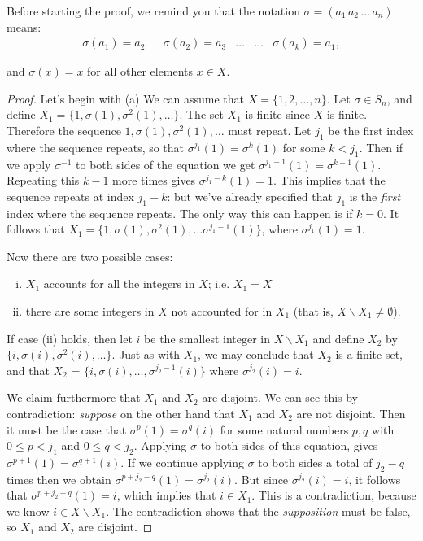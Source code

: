 \noindent
Before starting the proof, we remind you   that the notation $\sigma = (a_1 \, a_2 \, \ldots \, a_n)$ means:
\begin{align*}
\sigma( a_1 )  = a_2  & &
\sigma( a_2 )  = a_3 & 
 \ldots   & \ldots & 
\sigma( a_k )  = a_1,
\end{align*}

\noindent
and $\sigma( x) =x$ for all other elements $x \in X$.


\begin{proof}
Let's begin with (a)
We can assume that $X = \{ 1, 2, \ldots, n \}$. Let $\sigma \in S_n$,
and define $X_1 = \{1,  \sigma(1), \sigma^2(1), \ldots \}$. The set $X_1$ is finite since $X$ is finite. Therefore the sequence  $1, \sigma(1), \sigma^2(1), \ldots $ must repeat. Let $j_1$ be the first index where the sequence repeats, so that   $\sigma^{j_1}(1) = \sigma^k(1)$ for some $k < j_1$.  Then if we apply $\sigma^{-1}$  to both sides of the equation we get 
$\sigma^{j_1-1}(1) = \sigma^{k-1}(1)$. Repeating this $k-1$ more times gives $\sigma^{j_1-k}(1) = 1$. This implies that the sequence repeats at index $j_1-k$: but we've already specified that $j_1$ is the \emph{first} index where the sequence repeats. The only way this can happen is if $k=0$. It follows that $X_1 = \{1, \sigma(1), \sigma^2(1), \ldots \sigma^{j_1-1}(1) \}$, where $\sigma^{j_1}(1) = 1$.

Now there are two possible cases: 

\begin{enumerate}[(i)]
\item
$X_1$ accounts for all the integers in $X$; i.e. $X_1 = X$ 
\item
there are some integers in $X$ not accounted for in $X_1$ (that is, $X \backslash X_1 \neq \emptyset$).  
\end{enumerate}

If case (ii) holds, then  let $i$ be the smallest integer
in $X \backslash X_1$ and define $X_2$ by $\{ i, \sigma(i),
\sigma^2(i), \ldots \}$. Just as with $X_1$, we may conclude that $X_2$ is a finite set, and that $X_2$ = $\{ i, \sigma(i), \ldots, \sigma^{j_2-1}(i) \}$ where $\sigma^{j_2}(i) = i$.

We claim furthermore that  $X_1$ and $X_2$ are disjoint. We can see this by contradiction: \emph{suppose} on the other hand that $X_1$ and $X_2$ are not disjoint. Then it must be the case that $\sigma^p(1) = \sigma^q(i)$ for some natural numbers $p, q$ with $0 \le p < j_1$ and $0 \le q < j_2$. Applying $\sigma$ to both sides of this equation, gives $\sigma^{p+1}(1) = \sigma^{q+1}(i)$. If we  continue applying $\sigma$ to both sides a total of $j_2 - q$ times then we obtain $\sigma^{p+j_2 - q}(1) = \sigma^{j_2}(i)$. But since $\sigma^{j_2}(i) = i$, it follows that $\sigma^{p+j_2 - q}(1) = i$, which implies that $i \in X_1$. This is a contradiction, because we know $i \in X \backslash X_1$. The contradiction shows that the \emph{supposition} must be false, so $X_1$ and $X_2$ are disjoint.


\end{proof}
